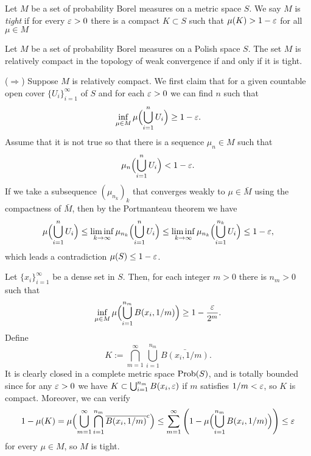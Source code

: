 \documentclass[a4paper]{article}
\begin{document}
\begin{defn}
Let $M$ be a set of probability Borel measures on a metric space $S$.
We say $M$ is \emph{tight} if for every $\varepsilon>0$ there is a compact $K\subset S$ such that $\mu(K)>1-\varepsilon$ for all $\mu\in M$
\end{defn}
\begin{thm}
Let $M$ be a set of probability Borel measures on a Polish space $S$.
The set $M$ is relatively compact in the topology of weak convergence if and only if it is tight.
\end{thm}
\begin{pf}
($\Rightarrow$)
Suppose $M$ is relatively compact.
We first claim that for a given countable open cover $\{U_i\}_{i=1}^\infty$ of $S$ and for each $\varepsilon>0$ we can find $n$ such that
\[\inf_{\mu\in M}\mu\Bigl(\bigcup_{i=1}^nU_i\Bigr)\ge1-\varepsilon.\]
Assume that it is not true so that there is a sequence $\mu_n\in M$ such that
\[\mu_n\Bigl(\bigcup_{i=1}^nU_i\Bigr)<1-\varepsilon.\]
If we take a subsequence $(\mu_{n_k})_k$ that converges weakly to $\mu\in\bar M$ using the compactness of $\bar M$, then by the Portmanteau theorem we have
\[\mu\Bigl(\bigcup_{i=1}^nU_i\Bigr)\le\liminf_{k\to\infty}\mu_{n_k}\Bigl(\bigcup_{i=1}^nU_i\Bigr)\le\liminf_{k\to\infty}\mu_{n_k}\Bigl(\bigcup_{i=1}^{n_k}U_i\Bigr)\le1-\varepsilon,\]
which leads a contradiction $\mu(S)\le1-\varepsilon$.

Let $\{x_i\}_{i=1}^\infty$ be a dense set in $S$.
Then, for each integer $m>0$ there is $n_m>0$ such that
\[\inf_{\mu\in M}\mu\Bigl(\bigcup_{i=1}^{n_m}B(x_i,1/m)\Bigr)\ge1-\frac{\varepsilon}{2^m}.\]
Define
\[K:=\bigcap_{m=1}^\infty\bigcup_{i=1}^{n_m}\bar{B(x_i,1/m)}.\]
It is clearly closed in a complete metric space $\operatorname{Prob}(S)$, and is totally bounded since for any $\varepsilon>0$ we have $K\subset\bigcup_{i=1}^{n_m}B(x_i,\varepsilon)$ if $m$ satisfies $1/m<\varepsilon$, so $K$ is compact.
Moreover, we can verify
\[1-\mu(K)=\mu\Bigl(\bigcup_{m=1}^\infty\bigcap_{i=1}^{n_m}\overline{B(x_i,1/m)}^c\Bigr)\le\sum_{m=1}^\infty\left(1-\mu\Bigl(\bigcup_{i=1}^{n_m}B(x_i,1/m)\Bigr)\right)\le\varepsilon\]
for every $\mu\in M$, so $M$ is tight.


\end{pf}
\end{document}
